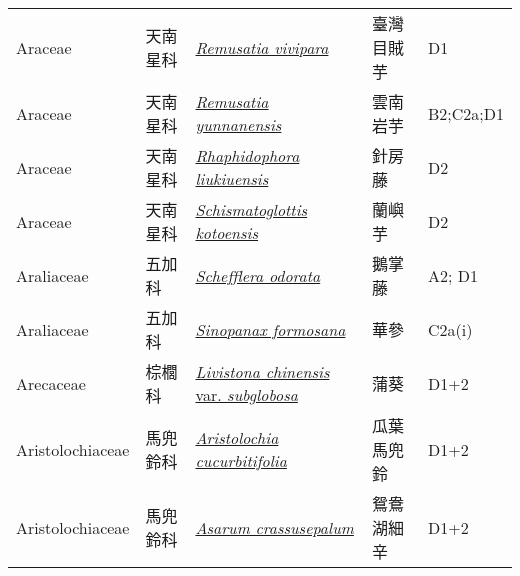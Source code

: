{\begin{longtable}{p{2.5cm}p{2cm}p{5cm}p{2.5cm}p{3cm}}
    Araceae & 天南星科 & \href{http://www.theplantlist.org/tpl1.1/search?q=Remusatia+vivipara}{\textit{Remusatia vivipara} } & 臺灣目賊芋 & D1 \index{Remusatia@\textit{Remusatia}!vivipara@\textit{vivipara}}  \index{臺灣目賊芋} \\
    Araceae & 天南星科 & \href{http://www.theplantlist.org/tpl1.1/search?q=Remusatia+yunnanensis}{\textit{Remusatia yunnanensis} } & 雲南岩芋 & B2;C2a;D1 \index{Remusatia@\textit{Remusatia}!yunnanensis@\textit{yunnanensis}}  \index{雲南岩芋} \\
    Araceae & 天南星科 & \href{http://www.theplantlist.org/tpl1.1/search?q=Rhaphidophora+liukiuensis}{\textit{Rhaphidophora liukiuensis} } & 針房藤 & D2 \index{Rhaphidophora@\textit{Rhaphidophora}!liukiuensis@\textit{liukiuensis}}  \index{針房藤} \\
    Araceae & 天南星科 & \href{http://www.theplantlist.org/tpl1.1/search?q=Schismatoglottis+kotoensis}{\textit{Schismatoglottis kotoensis} } & 蘭嶼芋 & D2 \index{Schismatoglottis@\textit{Schismatoglottis}!kotoensis@\textit{kotoensis}}  \index{蘭嶼芋} \\
    Araliaceae & 五加科 & \href{http://www.theplantlist.org/tpl1.1/search?q=Schefflera+odorata}{\textit{Schefflera odorata} } & 鵝掌藤 & A2; D1 \index{Schefflera@\textit{Schefflera}!odorata@\textit{odorata}}  \index{鵝掌藤} \\
    Araliaceae & 五加科 & \href{http://www.theplantlist.org/tpl1.1/search?q=Sinopanax+formosana}{\textit{Sinopanax formosana} } & 華參 & C2a(i) \index{Sinopanax@\textit{Sinopanax}!formosana@\textit{formosana}}  \index{華參} \\
    Arecaceae & 棕櫚科 & \href{http://www.theplantlist.org/tpl1.1/search?q=Livistona+chinensis+var.+subglobosa}{\textit{Livistona chinensis} var. \textit{subglobosa} } & 蒲葵 & D1+2 \index{Livistona@\textit{Livistona}!chinensis@\textit{chinensis}!var. subglobosa@var. \textit{subglobosa}}  \index{蒲葵} \\
    Aristolochiaceae & 馬兜鈴科 & \href{http://www.theplantlist.org/tpl1.1/search?q=Aristolochia+cucurbitifolia}{\textit{Aristolochia cucurbitifolia} } & 瓜葉馬兜鈴 & D1+2 \index{Aristolochia@\textit{Aristolochia}!cucurbitifolia@\textit{cucurbitifolia}}  \index{瓜葉馬兜鈴} \\
    Aristolochiaceae & 馬兜鈴科 & \href{http://www.theplantlist.org/tpl1.1/search?q=Asarum+crassusepalum}{\textit{Asarum crassusepalum} } & 鴛鴦湖細辛 & D1+2 \index{Asarum@\textit{Asarum}!crassusepalum@\textit{crassusepalum}}  \index{鴛鴦湖細辛} \\

\end{longtable}}
